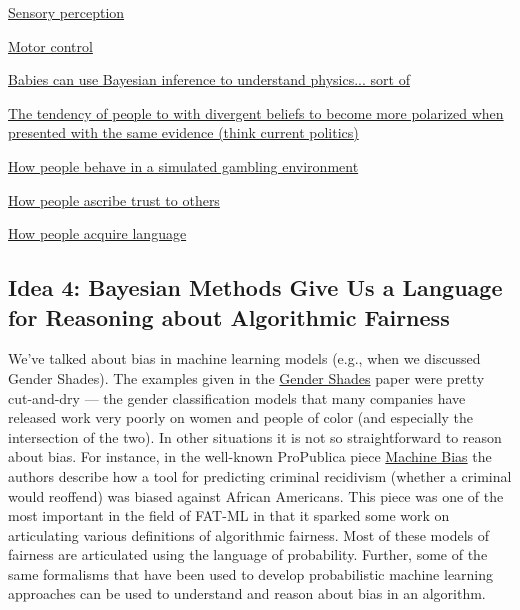 \documentclass[assignment01_Solutions]{subfiles}
\begin{document}
\bi
\item \href{https://www.sciencedirect.com/science/article/pii/S0022249615000061}{Sensory perception}
\item \href{https://www.nature.com/articles/nn963}{Motor control}
\item \href{http://web.mit.edu/cocosci/Papers/Science-2011-Teglas-1054-9.pdf}{Babies can use Bayesian inference to understand physics... sort of}
\item \href{https://www.ncbi.nlm.nih.gov/pubmed/24730598}{The tendency of people to with divergent beliefs to become more polarized when presented with the same evidence (think current politics)}
\item \href{https://www.sciencedirect.com/science/article/pii/S0022249608001090}{How people behave in a simulated gambling environment}
\item \href{https://arxiv.org/abs/1806.03916}{How people ascribe trust to others}
\item \href{https://www.sciencedirect.com/science/article/pii/S1364661306001318}{How people acquire language}
\ei


\subsection*{Idea 4: Bayesian Methods Give Us a Language for Reasoning about Algorithmic Fairness}

We've talked about bias in machine learning models (e.g., when we discussed Gender Shades).  The examples given in the \href{http://gendershades.org/overview.html}{Gender Shades} paper were pretty cut-and-dry --- the gender classification models that many companies have released work very poorly on women and people of color (and especially the intersection of the two).  In other situations it is not so straightforward to reason about bias. For instance, in the well-known ProPublica piece \href{https://www.propublica.org/article/machine-bias-risk-assessments-in-criminal-sentencing}{Machine Bias} the authors describe how a tool for predicting criminal recidivism (whether a criminal would reoffend) was biased against African Americans.  This piece was one of the most important in the field of FAT-ML in that it sparked some work on articulating various definitions of algorithmic fairness.  Most of these models of fairness are articulated using the language of probability.  Further, some of the same formalisms that have been used to develop probabilistic machine learning approaches can be used to understand and reason about bias in an algorithm.
\end{document}
